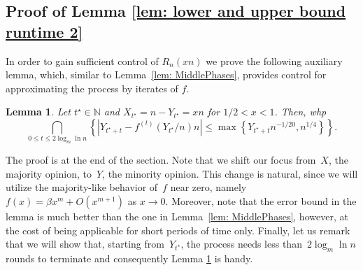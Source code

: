 \documentclass[11pt]{article}
\numberwithin{theorem}{section}
\newtheorem{lemma}[theorem]{Lemma}
\begin{document}
\subsection{Proof of Lemma \ref{lem: lower and upper bound runtime 2}}\label{subsec: runtime 2 proof}
In order to gain sufficient control of $R_n(xn)$ we prove the following auxiliary lemma, which, similar to Lemma~\ref{lem: MiddlePhases}, provides control for approximating the process by iterates of $f$. 
\begin{lemma}
\label{lem: ending phase concentration}
Let $t^\star\in\mathbb{N}$ and $X_{t^\star}=n-Y_{t^\star} = x n$ for $1/2<x<1$.  Then, whp
\[
    \bigcap_{0 \leq t \leq 2 \log_m\ln n} \left\{\left|Y_{t^\star+t} - f^{(t)}(Y_{t^\star}/n)n \right|\leq \max\left\{Y_{t^\star+t}n^{-1/20}, n^{1/4}\right\} \right\}.
\]
\end{lemma}
The proof is at the end of the section. Note that we shift our focus from~$X$, the majority opinion, to~$Y$, the minority opinion. This change is natural, since we will utilize the majority-like behavior of~$f$ near zero, namely~$f(x)=\beta x^m+O(x^{m+1})$ as $x\to 0$. Moreover, note that the error bound in the lemma is much better than the one in Lemma~\ref{lem: MiddlePhases}, however, at the cost of being applicable for short periods of time only. 
Finally, let us remark that we will show that, starting from~$Y_{t^\star}$, the process needs less than~$2 \log_m\ln n$ rounds to terminate and consequently Lemma \ref{lem: ending phase concentration} is handy.
\end{document}
